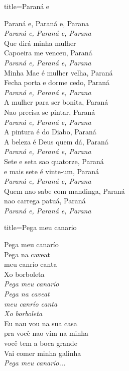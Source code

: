 \documentclass[fontsize=14pt, twoside]{scrreprt}
\begin{document}
\begin{multicols*}{2}
\columnbreak
\begin{song}{title={Paraná e}}
        \begin{verse*}
            Paraná e, Paraná e, Parana\\
            \textit{Paraná e, Paraná e, Parana}\\
            Que dirá minha mulher\\
            Capoeira me venceu, Paraná\\
            \textit{Paraná e, Paraná e, Parana}\\
            Minha Mae é mulher velha, Paraná\\
            Fecha porta e dorme cedo, Paraná\\
            \textit{Paraná e, Paraná e, Parana}\\
            A mulher para ser bonita, Paraná\\
            Nao precisa se pintar, Paraná\\
            \textit{Paraná e, Paraná e, Parana}\\
            A pintura é do Diabo, Paraná\\
            A beleza é Deus quem dá, Paraná\\
            \textit{Paraná e, Paraná e, Parana}\\
            Sete e seta sao quatorze, Paraná\\
            e mais sete é vinte-um, Paraná\\
            \textit{Paraná e, Paraná e, Parana}\\
            Quem nao sabe com mandinga, Paraná\\
            nao carrega patuá, Paraná\\
            \textit{Paraná e, Paraná e, Parana}\\
        \end{verse*}
\end{song}

\begin{song}{title={Pega meu canario}}
        \begin{verse*}
            Pega meu canarío\\
            Pega na caveat\\
            meu canrío canta\\
            Xo borboleta\\
            \textit{Pega meu canarío}\\
            \textit{Pega na caveat}\\
            \textit{meu canrío canta}\\
            \textit{Xo borboleta}\\
            Eu nau vou na sua casa\\
            pra você nao vim na minha\\
            você tem a boca grande\\
            Vai comer minha galinha\\
            \textit{Pega meu canarío...}\\
        \end{verse*}
\end{song}


\end{multicols*}
\end{document}
